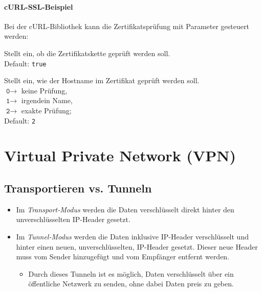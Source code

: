 \documentclass[a4paper, 11pt, accentcolor = tud3b]{tudreport}
\begin{document}
		                \paragraph{cURL-SSL-Beispiel}
			                Bei der cURL-Bibliothek kann die Zertifikatsprüfung mit Parameter gesteuert werden:
			                \begin{description}[leftmargin = 5cm]
			                	\item[\texttt{CURLOPT\_SSL\_VERIFYPEER}] Stellt ein, ob die Zertifikatskette geprüft werden soll. \\ Default: \texttt{true}
			                	\item[\texttt{CURLOPT\_SSL\_VERIFYHOST}] Stellt ein, wie der Hostname im Zertifikat geprüft werden soll. \\ \null\qquad\(\texttt{0} \rightarrow \) keine Prüfung, \\ \null\qquad\(\texttt{1} \rightarrow \) irgendein Name, \\ \null\qquad\(\texttt{2} \rightarrow \) exakte Prüfung; \\ Default: \texttt{2}
			                \end{description}

        \section{Virtual Private Network (VPN)}
            \subsection{Transportieren vs. Tunneln}
                \begin{itemize}
                	\item Im \textit{Transport-Modus} werden die Daten verschlüsselt direkt hinter den unverschlüsselten IP-Header gesetzt.
                	\item Im \textit{Tunnel-Modus} werden die Daten inklusive IP-Header verschlüsselt und hinter einen neuen, unverschlüsselten, IP-Header gesetzt. Dieser neue Header muss vom Sender hinzugefügt und vom Empfänger entfernt werden.
	                	\begin{itemize}
	                		\item Durch dieses Tunneln ist es möglich, Daten verschlüsselt über ein öffentliche Netzwerk zu senden, ohne dabei Daten preis zu geben.
	                	\end{itemize}
                \end{itemize}
\end{document}
